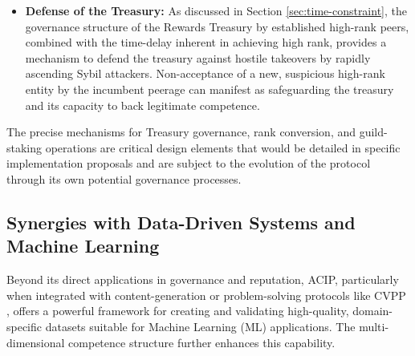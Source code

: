 \documentclass{article}
\begin{document}
\begin{CJK}{UTF8}{gbsn}
\begin{itemize}
            \item \textbf{Defense of the Treasury:} As discussed in Section \ref{sec:time-constraint}, the governance structure of the Rewards Treasury by established high-rank peers, combined with the time-delay inherent in achieving high rank, provides a mechanism to defend the treasury against hostile takeovers by rapidly ascending Sybil attackers. Non-acceptance of a new, suspicious high-rank entity by the incumbent peerage can manifest as safeguarding the treasury and its capacity to back legitimate competence.

        \end{itemize}
        The precise mechanisms for Treasury governance, rank conversion, and guild-staking operations are critical design elements that would be detailed in specific implementation proposals and are subject to the evolution of the protocol through its own potential governance processes.

        \subsection{Synergies with Data-Driven Systems and Machine Learning}
        \label{sec:ml_synergies}

        Beyond its direct applications in governance and reputation, ACIP, particularly when integrated with content-generation or problem-solving protocols like CVPP \cite{cvpp}, offers a powerful framework for creating and validating high-quality, domain-specific datasets suitable for Machine Learning (ML) applications. The multi-dimensional competence structure further enhances this capability.


\end{CJK}
\end{document}
